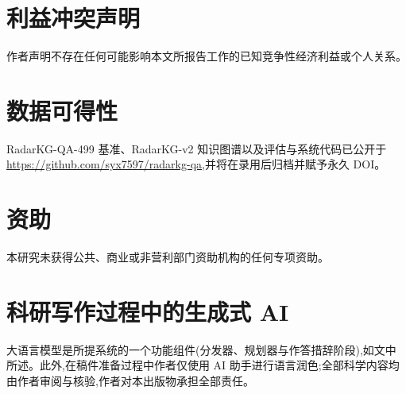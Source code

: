 \documentclass[11pt,a4paper]{article}
\begin{document}
\section*{利益冲突声明}
作者声明不存在任何可能影响本文所报告工作的已知竞争性经济利益或个人关系。

\section*{数据可得性}
RadarKG-QA-499 基准、RadarKG-v2 知识图谱以及评估与系统代码已公开于 \url{https://github.com/syx7597/radarkg-qa},并将在录用后归档并赋予永久 DOI。

\section*{资助}
本研究未获得公共、商业或非营利部门资助机构的任何专项资助。

\section*{科研写作过程中的生成式 AI}
大语言模型是所提系统的一个功能组件(分发器、规划器与作答措辞阶段),如文中所述。此外,在稿件准备过程中作者仅使用 AI 助手进行语言润色;全部科学内容均由作者审阅与核验,作者对本出版物承担全部责任。



\end{document}
